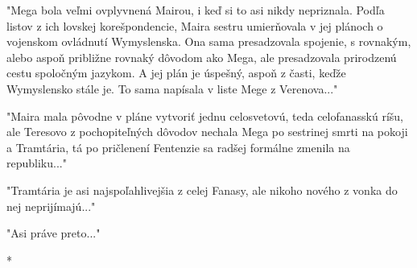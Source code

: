 \documentclass{book}
\begin{document}
"$ $Mega bola veľmi ovplyvnená Mairou, i keď si to asi nikdy nepriznala. Podľa listov z ich lovskej korešpondencie, Maira sestru umierňovala v jej plánoch o vojenskom ovládnutí Wymyslenska. Ona sama presadzovala spojenie, s rovnakým, alebo aspoň približne rovnaký dôvodom ako Mega, ale presadzovala prirodzenú cestu spoločným jazykom. A jej plán je úspešný, aspoň z časti, keďže Wymyslensko stále je. To sama napísala v liste Mege z Verenova..."$ $ 

"$ $Maira mala pôvodne v pláne vytvoriť jednu celosvetovú, teda celofanasskú ríšu, ale Teresovo z pochopiteľných dôvodov nechala Mega po sestrinej smrti na pokoji a Tramtária, tá po pričlenení Fentenzie sa radšej formálne zmenila na republiku..."$ $ 

"$ $Tramtária je asi najspoľahlivejšia z celej Fanasy, ale nikoho nového z vonka do nej neprijímajú..."$ $ 

"$ $Asi práve preto..."$ $ 

\begin{center}

*

\end{center}
\end{document}
